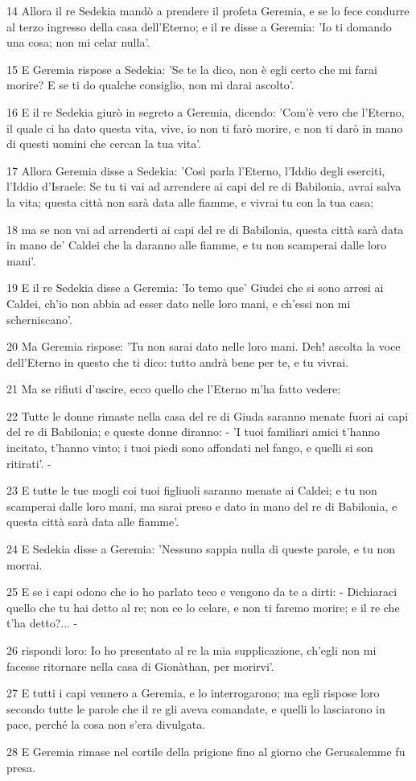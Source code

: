 \par 14 Allora il re Sedekia mandò a prendere il profeta Geremia, e se lo fece condurre al terzo ingresso della casa dell'Eterno; e il re disse a Geremia: 'Io ti domando una cosa; non mi celar nulla'.
\par 15 E Geremia rispose a Sedekia: 'Se te la dico, non è egli certo che mi farai morire? E se ti do qualche consiglio, non mi darai ascolto'.
\par 16 E il re Sedekia giurò in segreto a Geremia, dicendo: 'Com'è vero che l'Eterno, il quale ci ha dato questa vita, vive, io non ti farò morire, e non ti darò in mano di questi uomini che cercan la tua vita'.
\par 17 Allora Geremia disse a Sedekia: 'Così parla l'Eterno, l'Iddio degli eserciti, l'Iddio d'Israele: Se tu ti vai ad arrendere ai capi del re di Babilonia, avrai salva la vita; questa città non sarà data alle fiamme, e vivrai tu con la tua casa;
\par 18 ma se non vai ad arrenderti ai capi del re di Babilonia, questa città sarà data in mano de' Caldei che la daranno alle fiamme, e tu non scamperai dalle loro mani'.
\par 19 E il re Sedekia disse a Geremia: 'Io temo que' Giudei che si sono arresi ai Caldei, ch'io non abbia ad esser dato nelle loro mani, e ch'essi non mi scherniscano'.
\par 20 Ma Geremia rispose: 'Tu non sarai dato nelle loro mani. Deh! ascolta la voce dell'Eterno in questo che ti dico: tutto andrà bene per te, e tu vivrai.
\par 21 Ma se rifiuti d'uscire, ecco quello che l'Eterno m'ha fatto vedere:
\par 22 Tutte le donne rimaste nella casa del re di Giuda saranno menate fuori ai capi del re di Babilonia; e queste donne diranno: - 'I tuoi familiari amici t'hanno incitato, t'hanno vinto; i tuoi piedi sono affondati nel fango, e quelli si son ritirati'. -
\par 23 E tutte le tue mogli coi tuoi figliuoli saranno menate ai Caldei; e tu non scamperai dalle loro mani, ma sarai preso e dato in mano del re di Babilonia, e questa città sarà data alle fiamme'.
\par 24 E Sedekia disse a Geremia: 'Nessuno sappia nulla di queste parole, e tu non morrai.
\par 25 E se i capi odono che io ho parlato teco e vengono da te a dirti: - Dichiaraci quello che tu hai detto al re; non ce lo celare, e non ti faremo morire; e il re che t'ha detto?... -
\par 26 rispondi loro: Io ho presentato al re la mia supplicazione, ch'egli non mi facesse ritornare nella casa di Gionàthan, per morirvi'.
\par 27 E tutti i capi vennero a Geremia, e lo interrogarono; ma egli rispose loro secondo tutte le parole che il re gli aveva comandate, e quelli lo lasciarono in pace, perché la cosa non s'era divulgata.
\par 28 E Geremia rimase nel cortile della prigione fino al giorno che Gerusalemme fu presa.

